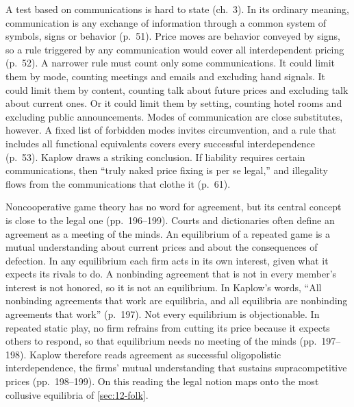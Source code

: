 A test based on communications is hard to state (ch.~3). In its ordinary meaning, communication is any exchange of
information through a common system of symbols, signs or behavior (p.~51). Price moves are behavior conveyed by
signs, so a rule triggered by any communication would cover all interdependent pricing (p.~52). A narrower rule must
count only some communications. It could limit them by mode, counting meetings and emails and excluding hand
signals. It could limit them by content, counting talk about future prices and excluding talk about current ones. Or
it could limit them by setting, counting hotel rooms and excluding public announcements. Modes of communication are close substitutes, however. A fixed list of forbidden modes invites
circumvention, and a rule that includes all functional equivalents covers every successful interdependence
(p.~53). Kaplow draws a striking conclusion. If liability requires certain communications, then ``truly naked price
fixing is per se legal,'' and illegality flows from the communications that clothe it (p.~61).

Noncooperative game theory has no word for agreement, but its central concept is close to the legal one
(pp.~196--199). Courts and dictionaries often define an agreement as a meeting of the minds. An equilibrium of a
repeated game is a mutual understanding about current prices and about the consequences of defection. In any
equilibrium each firm acts in its own interest, given what it expects its rivals to do. A nonbinding agreement that
is not in every member's interest is not honored, so it is not an equilibrium. In Kaplow's words, ``All nonbinding
agreements that work are equilibria, and all equilibria are nonbinding agreements that work'' (p.~197). Not every
equilibrium is objectionable. In repeated static play, no firm refrains from cutting its price because it expects
others to respond, so that equilibrium needs no meeting of the minds (pp.~197--198). Kaplow therefore reads
agreement as successful oligopolistic interdependence, the firms' mutual understanding that sustains
supracompetitive prices (pp.~198--199). On this reading the legal notion maps onto the most collusive equilibria of
\cref{sec:12-folk}.

